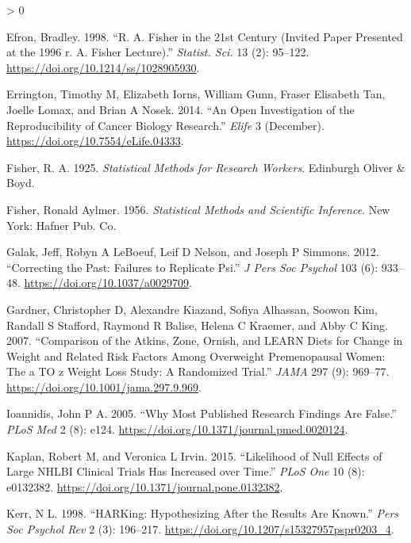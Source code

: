 \documentclass[
  12pt,
]{book}
\newlength{\cslhangindent}
\newenvironment{CSLReferences}[2] %
 {%
  \setlength{\parindent}{0pt}
  \ifodd #1 \everypar{\setlength{\hangindent}{\cslhangindent}}\ignorespaces\fi
  \ifnum #2 > 0
  \setlength{\parskip}{#2\baselineskip}
  \fi
 }%
 {}
\begin{document}
\begin{CSLReferences}{1}{0}
\leavevmode\hypertarget{ref-efron1998}{}%
Efron, Bradley. 1998. {``R. A. Fisher in the 21st Century (Invited Paper Presented at the 1996 r. A. Fisher Lecture).''} \emph{Statist. Sci.} 13 (2): 95--122. \url{https://doi.org/10.1214/ss/1028905930}.

\leavevmode\hypertarget{ref-erri:iorn:gunn:2014}{}%
Errington, Timothy M, Elizabeth Iorns, William Gunn, Fraser Elisabeth Tan, Joelle Lomax, and Brian A Nosek. 2014. {``An Open Investigation of the Reproducibility of Cancer Biology Research.''} \emph{Elife} 3 (December). \url{https://doi.org/10.7554/eLife.04333}.

\leavevmode\hypertarget{ref-fisher1925statistical}{}%
Fisher, R. A. 1925. \emph{Statistical Methods for Research Workers}. Edinburgh Oliver \& Boyd.

\leavevmode\hypertarget{ref-fish:1956}{}%
Fisher, Ronald Aylmer. 1956. \emph{Statistical Methods and Scientific Inference}. New York: Hafner Pub. Co.

\leavevmode\hypertarget{ref-gala:lebo:nels:2012}{}%
Galak, Jeff, Robyn A LeBoeuf, Leif D Nelson, and Joseph P Simmons. 2012. {``Correcting the Past: Failures to Replicate Psi.''} \emph{J Pers Soc Psychol} 103 (6): 933--48. \url{https://doi.org/10.1037/a0029709}.

\leavevmode\hypertarget{ref-gard:kiaz:alha:2007}{}%
Gardner, Christopher D, Alexandre Kiazand, Sofiya Alhassan, Soowon Kim, Randall S Stafford, Raymond R Balise, Helena C Kraemer, and Abby C King. 2007. {``Comparison of the Atkins, Zone, Ornish, and LEARN Diets for Change in Weight and Related Risk Factors Among Overweight Premenopausal Women: The a TO z Weight Loss Study: A Randomized Trial.''} \emph{JAMA} 297 (9): 969--77. \url{https://doi.org/10.1001/jama.297.9.969}.

\leavevmode\hypertarget{ref-ioan:2005}{}%
Ioannidis, John P A. 2005. {``Why Most Published Research Findings Are False.''} \emph{PLoS Med} 2 (8): e124. \url{https://doi.org/10.1371/journal.pmed.0020124}.

\leavevmode\hypertarget{ref-kapl:irvi:2015}{}%
Kaplan, Robert M, and Veronica L Irvin. 2015. {``Likelihood of Null Effects of Large NHLBI Clinical Trials Has Increased over Time.''} \emph{PLoS One} 10 (8): e0132382. \url{https://doi.org/10.1371/journal.pone.0132382}.

\leavevmode\hypertarget{ref-kerr:1998}{}%
Kerr, N L. 1998. {``HARKing: Hypothesizing After the Results Are Known.''} \emph{Pers Soc Psychol Rev} 2 (3): 196--217. \url{https://doi.org/10.1207/s15327957pspr0203_4}.


\end{CSLReferences}
\end{document}
